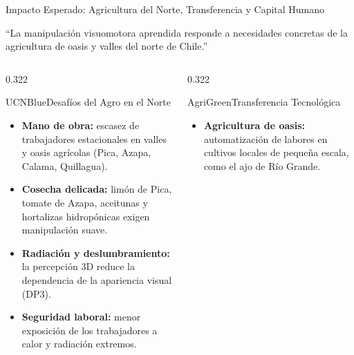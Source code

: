 \documentclass[aspectratio=169,10pt,xcolor={dvipsnames,table}]{beamer}
\newcommand{\BannerFont}{\fontsize{7.5}{9.2}\selectfont\bfseries}       %
\newcommand{\BannerArc}{1.5pt}             %
\newcommand{\BannerRule}{0.5pt}            %
\newcommand{\BannerLeftRule}{2.5pt}        %
\newcommand{\CardHeightDouble}{42.5mm}     %
\newcommand{\BannerCentral}[2][UCNCyan]{%
  \begin{tcolorbox}[
    enhanced,
    colback=#1!10,
    colframe=#1,
    boxrule=\BannerRule,
    leftrule=\BannerLeftRule,
    arc=\BannerArc,
    top=0.35mm, bottom=0.35mm, left=2mm, right=2mm
  ]
    {\BannerFont\raggedright\textcolor{UCNBlue}{#2}\par}
  \end{tcolorbox}%
  \vspace{-2.5mm}%
}
\newcommand{\BannerRef}[1]{{\mdseries\fontsize{5}{6}\selectfont\textcolor{TextDark!65}{\cite{#1}}}} %
\newcommand{\NoteFont}{\fontsize{5.6}{6.9}\selectfont}                  %
\begin{document}
\begin{frame}{Impacto Esperado: Agricultura del Norte, Transferencia y Capital Humano}
  \BannerCentral[UCNBlue]{``La manipulación visuomotora aprendida responde a necesidades concretas de la agricultura de oasis y valles del norte de Chile.'' \BannerRef{wang2026agrinav,mahmoudi2024imitation}}
  \vspace{0.8mm}
  \begin{columns}[T, onlytextwidth]
    \begin{column}{0.322\textwidth}
      \begin{Card}[height=\CardHeightDouble]{UCNBlue}{Desafíos del Agro en el Norte}
        {\NoteFont
        \begin{itemize}\setlength{\itemsep}{1pt}
          \item[\textcolor{UCNBlue}{$\blacktriangleright$}] \textbf{Mano de obra:} escasez de trabajadores estacionales en valles y oasis agrícolas (Pica, Azapa, Calama, Quillagua).
          \item[\textcolor{UCNBlue}{$\blacktriangleright$}] \textbf{Cosecha delicada:} limón de Pica, tomate de Azapa, aceitunas y hortalizas hidropónicas exigen manipulación suave.
          \item[\textcolor{UCNBlue}{$\blacktriangleright$}] \textbf{Radiación y deslumbramiento:} la percepción 3D reduce la dependencia de la apariencia visual (DP3).
          \item[\textcolor{UCNBlue}{$\blacktriangleright$}] \textbf{Seguridad laboral:} menor exposición de los trabajadores a calor y radiación extremos.
        \end{itemize}}
      \end{Card}
    \end{column}
    \begin{column}{0.322\textwidth}
      \begin{Card}[height=\CardHeightDouble]{AgriGreen}{Transferencia Tecnológica}
        {\NoteFont
        \begin{itemize}\setlength{\itemsep}{1pt}
          \item[\textcolor{AgriGreenDark}{$\blacktriangleright$}] \textbf{Agricultura de oasis:} automatización de labores en cultivos locales de pequeña escala, como el ajo de Río Grande.

\end{itemize}}
\end{Card}
\end{column}
\end{columns}
\end{frame}
\end{document}
